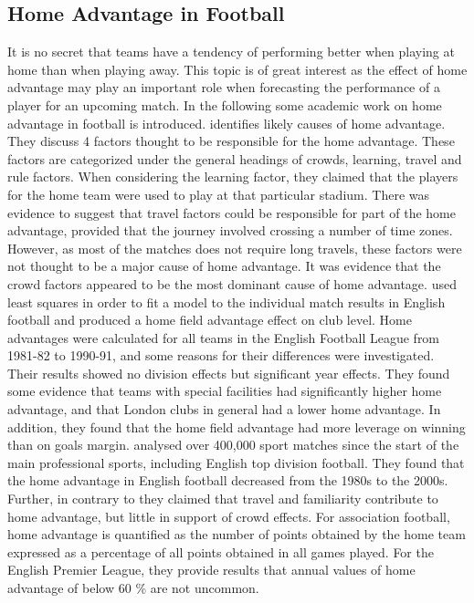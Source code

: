 \subsection{Home Advantage in Football}\label{HomeFieldAdvantage}
It is no secret that teams have a tendency of performing better when playing at home than when playing away. This topic is of great interest as the effect of home advantage may play an important role when forecasting the performance of a player for an upcoming match. In the following some academic work on home advantage in football is introduced.
\newpar
\cite{Nevill} identifies likely causes of home advantage. They discuss 4 factors thought to be responsible for the home advantage. These factors are categorized under the general headings of crowds, learning, travel and rule factors. When considering the learning factor, they claimed that the players for the home team were used to play at that particular stadium. There was evidence to suggest that travel factors could be responsible for part of the home advantage, provided that the journey involved crossing a number of time zones. However, as most of the matches does not require long travels, these factors were not thought to be a major cause of home advantage. It was evidence that the crowd factors appeared to be the most dominant cause of home advantage.
\newpar
\cite{Clarke} used least squares in order to fit a model to the individual match results in English football and produced a home field advantage effect on club level. Home advantages were calculated for all teams in the English Football League from 1981-82 to 1990-91, and some reasons for their differences were investigated. Their results showed no division effects but significant year effects. They found some evidence that teams with special facilities had significantly higher home advantage, and that London clubs in general had a lower home advantage. In addition, they found that the home field advantage had more leverage on winning than on goals margin. 
\newpar
\cite{Pollard} analysed over 400,000 sport matches since the start of the main professional sports, including English top division football. They found that the home advantage in English football decreased from the 1980s to the 2000s. Further, in contrary to \cite{Nevill} they claimed that travel and familiarity contribute to home advantage, but little in support of crowd effects. For association football, \cite{Pollard} home advantage is quantified as the number of points obtained by the home team expressed as a percentage of all points obtained in all games played. For the English Premier League, they provide results that annual values of home advantage of below 60 \% are not uncommon. 
\newpar


